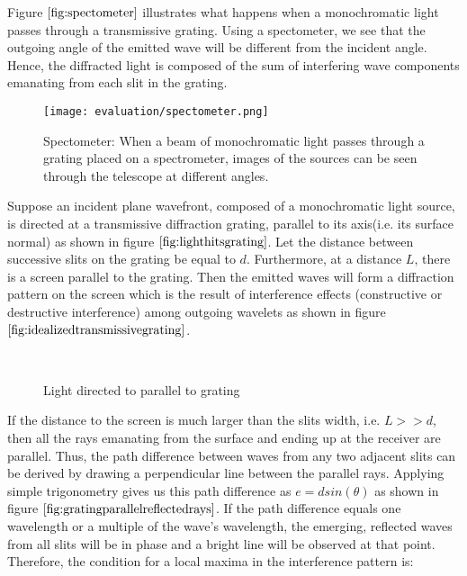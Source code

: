 Figure $\ref{fig:spectometer}$ illustrates what happens when a monochromatic light passes through a transmissive grating. Using a spectometer, we see that the outgoing angle of the emitted wave will be different from the incident angle. Hence, the diffracted light is composed of the sum of interfering wave components emanating from each slit in the grating.

\begin{figure}[H]
  \centering
  \texttt{[image: evaluation/spectometer.png]}
  \caption[Spectometer]{Spectometer: When a beam of monochromatic light passes through a grating placed on a spectrometer, images of the sources can be seen through the telescope at different angles.}
\label{fig:spectometer}
\end{figure}

Suppose an incident plane wavefront, composed of a monochromatic light source, is directed at a transmissive diffraction grating, parallel to its axis(i.e. its surface normal) as shown in figure $\ref{fig:lighthitsgrating}$. Let the distance between successive slits on the grating be equal to $d$. Furthermore, at a distance $L$, there is a screen parallel to the grating. Then the emitted waves will form a diffraction pattern on the screen which is the result of interference effects (constructive or destructive interference) among outgoing wavelets as shown in figure $\ref{fig:idealizedtransmissivegrating}$. 

\begin{figure}[H]
  \centering
~  

\caption[Idealized Diffraction Grating]{Light directed to parallel to grating}
\label{fig:lighthitsgrating}
\end{figure}

If the distance to the screen is much larger than the slits width, i.e. $L >> d$, then all the rays emanating from the surface and ending up at the receiver are parallel. Thus, the path difference between waves from any two adjacent slits can be derived by drawing a perpendicular line between the parallel rays. Applying simple trigonometry gives us this path difference as $e = d sin(\theta)$ as shown in figure $\ref{fig:gratingparallelreflectedrays}$. If the path difference equals one wavelength or a multiple of the wave's wavelength, the emerging, reflected waves from all slits will be in phase and a bright line will be observed at that point. Therefore, the condition for a local maxima in the interference pattern is: 


